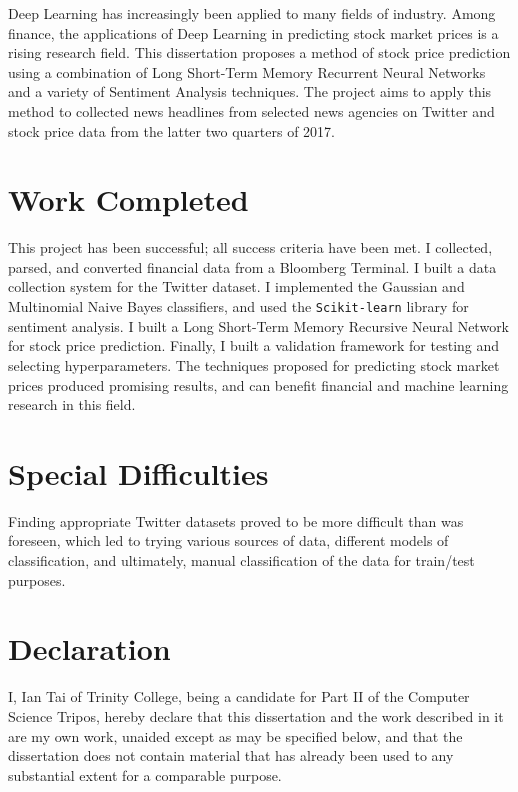 \documentclass[12pt,a4paper,twoside,openright]{report}
\begin{document}
Deep Learning has increasingly been applied to many fields of industry. Among finance,
the applications of Deep Learning in predicting stock market prices is a
rising research field. This dissertation proposes a method of stock price prediction
using a combination of Long Short-Term Memory Recurrent Neural Networks and a variety
of Sentiment Analysis techniques. The project aims to apply this method to collected 
news headlines from selected news agencies on Twitter and stock price data from the 
latter two quarters of 2017.

\section*{Work Completed}

This project has been successful; all success criteria have been met. I collected, parsed, and converted
financial data from a Bloomberg Terminal. I 
built a data collection system for the Twitter dataset. I implemented the
Gaussian and Multinomial Naive Bayes classifiers, and used the
\texttt{Scikit-learn} library for sentiment analysis. I built
a Long Short-Term Memory Recursive Neural Network for stock price prediction. Finally,
I built a validation framework for testing and selecting hyperparameters. The techniques
proposed for predicting stock market prices produced promising results, 
and can benefit financial and machine learning research in this field.

\section*{Special Difficulties}

Finding appropriate Twitter datasets proved to be more difficult than was foreseen, which led to
trying various sources of data, different models of classification, and ultimately, manual classification
of the data for train/test purposes.
 
\newpage
\section*{Declaration}

I, Ian Tai of Trinity College, being a candidate for Part II of the Computer Science
Tripos, hereby declare that this dissertation and the work described in it are my
own work, unaided except as may be specified below, and that the dissertation
does not contain material that has already been used to any substantial extent
for a comparable purpose.
\end{document}
